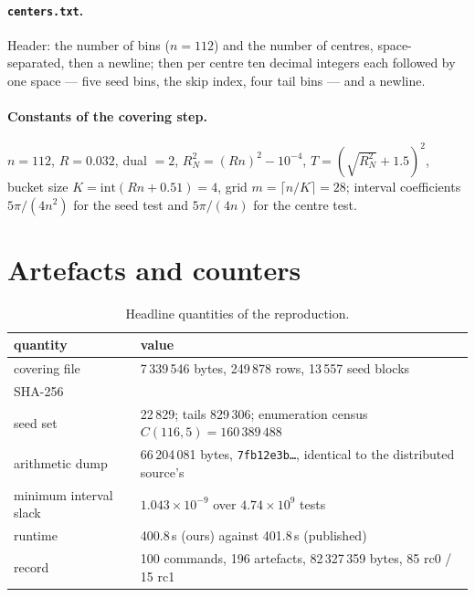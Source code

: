 \documentclass[11pt,a4paper]{article}
\newcommand{\longhash}[1]{\texttt{\footnotesize\seqsplit{#1}}}
\newcommand{\code}[1]{\texttt{\small #1}}
\newcommand{\sha}[1]{\texttt{\scriptsize #1}}
\begin{document}
\paragraph{\code{centers.txt}.} Header: the number of bins ($n=112$) and the number of centres, space-separated, then a newline;
then per centre ten decimal integers each followed by one space --- five seed bins, the skip index,
four tail bins --- and a newline.

\paragraph{Constants of the covering step.} $n=112$, $R=0.032$, dual $=2$,
$R_N^2=(Rn)^2-10^{-4}$, $T=(\sqrt{R_N^2}+1.5)^2$, bucket size $K=\mathrm{int}(Rn+0.51)=4$, grid
$m=\lceil n/K\rceil=28$; interval coefficients $5\pi/(4n^2)$ for the seed test and $5\pi/(4n)$ for the
centre test.

\section{Artefacts and counters}\label{app:counters}

\begin{table}[h]
\centering\small
\caption{Headline quantities of the reproduction.}
\begin{tabular}{ll}
\toprule
quantity & value \\
\midrule
covering file & 7\,339\,546 bytes, 249\,878 rows, 13\,557 seed blocks \\
SHA-256 & \longhash{c48bc9a2be1eb2cdeea82ea1b030d7cb9f00a6c9563b63f0248dd115748a5789} \\
seed set & 22\,829; tails 829\,306; enumeration census $C(116,5)=160\,389\,488$ \\
arithmetic dump & 66\,204\,081 bytes, \sha{7fb12e3b\ldots}, identical to the distributed source's \\
minimum interval slack & $1.043\times10^{-9}$ over $4.74\times10^{9}$ tests \\
runtime & 400.8\,s (ours) against 401.8\,s (published) \\
record & 100 commands, 196 artefacts, 82\,327\,359 bytes, 85 rc0 / 15 rc1 \\
\bottomrule
\end{tabular}
\end{table}


\end{document}
